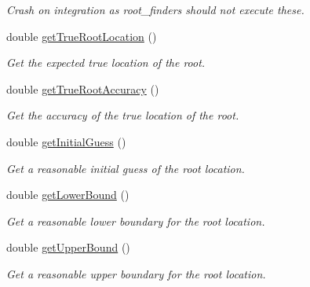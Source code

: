 \begin{DoxyCompactItemize}
\begin{DoxyCompactList}\small\item\em Crash on integration as root\+\_\+finders should not execute these. \end{DoxyCompactList}\item 
double \hyperlink{structtudat_1_1unit__tests_1_1TestFunctionWithLargeRootDifference_a439cda1f530624813aad4f065a69eefa}{get\+True\+Root\+Location} ()
\begin{DoxyCompactList}\small\item\em Get the expected true location of the root. \end{DoxyCompactList}\item 
double \hyperlink{structtudat_1_1unit__tests_1_1TestFunctionWithLargeRootDifference_aeba45d53a6d6482377744cb889e8c947}{get\+True\+Root\+Accuracy} ()
\begin{DoxyCompactList}\small\item\em Get the accuracy of the true location of the root. \end{DoxyCompactList}\item 
double \hyperlink{structtudat_1_1unit__tests_1_1TestFunctionWithLargeRootDifference_a10231b2476aa664162a5900dfacf1f91}{get\+Initial\+Guess} ()
\begin{DoxyCompactList}\small\item\em Get a reasonable initial guess of the root location. \end{DoxyCompactList}\item 
double \hyperlink{structtudat_1_1unit__tests_1_1TestFunctionWithLargeRootDifference_aef246bc65fd316c985bf872c53359a82}{get\+Lower\+Bound} ()
\begin{DoxyCompactList}\small\item\em Get a reasonable lower boundary for the root location. \end{DoxyCompactList}\item 
double \hyperlink{structtudat_1_1unit__tests_1_1TestFunctionWithLargeRootDifference_a2985501153bd12d2888a0e7762ba916e}{get\+Upper\+Bound} ()
\begin{DoxyCompactList}\small\item\em Get a reasonable upper boundary for the root location. \end{DoxyCompactList}\end{DoxyCompactItemize}
